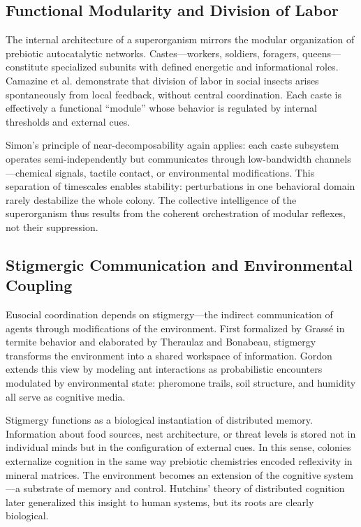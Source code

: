 \documentclass[11pt,a4paper]{article}
\begin{document}
\subsection{Functional Modularity and Division of Labor}

The internal architecture of a superorganism mirrors the modular organization of prebiotic autocatalytic networks.  Castes—workers, soldiers, foragers, queens—constitute specialized subunits with defined energetic and informational roles.  Camazine et al. \citep{Camazine2001SelfOrganizationBiologicalSystems} demonstrate that division of labor in social insects arises spontaneously from local feedback, without central coordination.  Each caste is effectively a functional “module” whose behavior is regulated by internal thresholds and external cues.

Simon’s principle of near-decomposability \citep{Simon1962ArchitectureComplexity} again applies: each caste subsystem operates semi-independently but communicates through low-bandwidth channels—chemical signals, tactile contact, or environmental modifications.  This separation of timescales enables stability: perturbations in one behavioral domain rarely destabilize the whole colony.  The collective intelligence of the superorganism thus results from the coherent orchestration of modular reflexes, not their suppression.

\subsection{Stigmergic Communication and Environmental Coupling}

Eusocial coordination depends on stigmergy—the indirect communication of agents through modifications of the environment.  First formalized by Grassé in termite behavior and elaborated by Theraulaz and Bonabeau, stigmergy transforms the environment into a shared workspace of information.  Gordon \citep{Gordon2010AntEncounters} extends this view by modeling ant interactions as probabilistic encounters modulated by environmental state: pheromone trails, soil structure, and humidity all serve as cognitive media.

Stigmergy functions as a biological instantiation of distributed memory.  Information about food sources, nest architecture, or threat levels is stored not in individual minds but in the configuration of external cues.  In this sense, colonies externalize cognition in the same way prebiotic chemistries encoded reflexivity in mineral matrices.  The environment becomes an extension of the cognitive system—a substrate of memory and control.  Hutchins’ theory of distributed cognition \citep{Hutchins1995CognitionInTheWild} later generalized this insight to human systems, but its roots are clearly biological.
\end{document}
